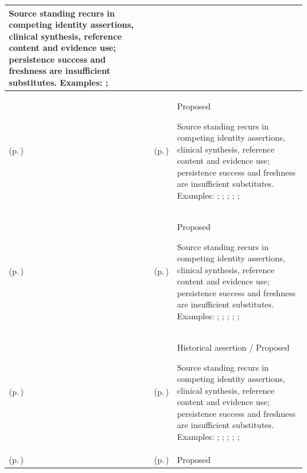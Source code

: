 \begin{longtable}{|>{\raggedright\arraybackslash}p{0.27\TableWidth}|>{\raggedright\arraybackslash}p{0.27\TableWidth}|>{\raggedright\arraybackslash}p{0.46\TableWidth}|}
Source standing recurs in competing identity assertions, clinical synthesis, reference content and evidence use; persistence success and freshness are insufficient substitutes. Examples: \nameref{feature:information-authority-source-standing-representation}; \nameref{function:qualify-information-authority-standing}\\\hline
\nameref{cap:bec-patient-clinical-record} (p.\,\pageref{cap:bec-patient-clinical-record}) & \nameref{cap:ec-information-authority-qualification} (p.\,\pageref{cap:ec-information-authority-qualification}) & Proposed

Source standing recurs in competing identity assertions, clinical synthesis, reference content and evidence use; persistence success and freshness are insufficient substitutes. Examples: \nameref{feature:feat-ise-01}; \nameref{feature:feat-ise-02}; \nameref{feature:feat-ise-03}; \nameref{function:assemble-longitudinal-clinical-record}; \nameref{service:longitudinal-clinical-record-query}; \nameref{function:maintain-active-clinical-record}\\\hline
\nameref{cap:bec-person-identity} (p.\,\pageref{cap:bec-person-identity}) & \nameref{cap:ec-information-authority-qualification} (p.\,\pageref{cap:ec-information-authority-qualification}) & Proposed

Source standing recurs in competing identity assertions, clinical synthesis, reference content and evidence use; persistence success and freshness are insufficient substitutes. Examples: \nameref{feature:feat-em-01}; \nameref{feature:feat-em-02}; \nameref{feature:feat-em-03}; \nameref{feature:feat-em-04}; \nameref{function:resolve-person-identifier}; \nameref{service:person-identifier-resolution}\\\hline
\nameref{cap:bec-governed-assurance} (p.\,\pageref{cap:bec-governed-assurance}) & \nameref{cap:ec-information-authority-qualification} (p.\,\pageref{cap:ec-information-authority-qualification}) & Historical assertion / Proposed

Source standing recurs in competing identity assertions, clinical synthesis, reference content and evidence use; persistence success and freshness are insufficient substitutes. Examples: \nameref{function:establish-assurance-context}; \nameref{function:assess-assurance-evidence}; \nameref{function:adjudicate-assurance-assessment}; \nameref{service:request-service-assurance}; \nameref{service:request-service-assurance-status}; \nameref{service:communicate-service-assurance-outcome}\\\hline
\nameref{cap:bec-governed-reference-dataset-administration} (p.\,\pageref{cap:bec-governed-reference-dataset-administration}) & \nameref{cap:ec-information-authority-qualification} (p.\,\pageref{cap:ec-information-authority-qualification}) & Proposed


\end{longtable}
